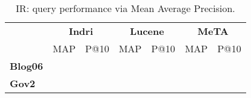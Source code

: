 \begin{table}[t]
\centering
{\small
\begin{tabular}{|l|cc|cc|cc|}
    \hline &
    \multicolumn{2}{c|}{\textbf{Indri}} &
    \multicolumn{2}{c|}{\textbf{Lucene}} &
    \multicolumn{2}{c|}{\textbf{MeTA}} \\
    & MAP & P@10 & MAP & P@10 & MAP & P@10\\
    \hline
    \textbf{Blog06} & & & & & & \\
    \textbf{Gov2} & & & & & & \\
    \hline
\end{tabular}
\caption{IR: query performance via Mean Average Precision.}
}
\label{table:ir-map}
\end{table}

